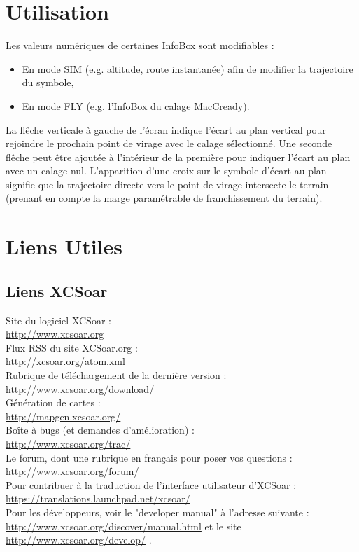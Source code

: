 \documentclass{article}
\begin{document}
\section{Utilisation}
\noindent
Les valeurs numériques de certaines InfoBox sont modifiables :
\begin{itemize}
\item  En mode SIM (e.g. altitude, route instantanée) afin de modifier la trajectoire du symbole,
\item En mode FLY (e.g. l'InfoBox du calage MacCready).
\end{itemize}
\noindent
\newline
La flêche verticale à gauche de l'écran indique l'écart au plan vertical pour rejoindre le prochain point de virage avec le calage sélectionné. Une seconde flêche peut être ajoutée à l'intérieur de la première pour indiquer l'écart au plan avec un calage nul. L'apparition d'une croix sur le symbole d'écart au plan signifie que la trajectoire directe vers le point de virage intersecte le terrain (prenant en compte la marge paramétrable de franchissement du terrain).\\
\section{Liens Utiles}
\noindent
\label{LiensUtiles}
\subsection{Liens XCSoar}
\noindent
Site du logiciel XCSoar :\\
\url{http://www.xcsoar.org}\\
\newline
Flux RSS du site XCSoar.org :\\
\url{http://xcsoar.org/atom.xml}\\
\newline
Rubrique de téléchargement de la dernière version :\\
\url{http://www.xcsoar.org/download/}\\
\newline
Génération de cartes :\\
\url{http://mapgen.xcsoar.org/}\\
\newline
Boîte à bugs (et demandes d'amélioration) :\\ \url{http://www.xcsoar.org/trac/}\\
\newline
Le forum, dont une rubrique en français pour poser vos questions :\\
\url{http://www.xcsoar.org/forum/}\\
\newline
Pour contribuer à la traduction de l'interface utilisateur d'XCSoar :\\
\url{https://translations.launchpad.net/xcsoar/}\\
\newline
Pour les développeurs, voir le "developer manual" à l'adresse suivante : \url{http://www.xcsoar.org/discover/manual.html} et le site \url{http://www.xcsoar.org/develop/} .
%
\end{document}
